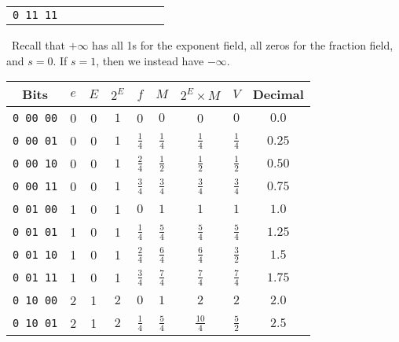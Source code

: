 \documentclass[12pt]{article}
\newenvironment{ex}[2][Exercise]{\begin{trivlist}
		\item[\hskip \labelsep {\bfseries #1}\hskip \labelsep {\bfseries #2.}]}{\end{trivlist}}
\newenvironment{sol}[1][Solution]{\begin{trivlist}
		\item[\hskip \labelsep {\bfseries #1:}]}{\end{trivlist}}
\begin{document}
\begin{ex}{2.47}
\begin{center}
\begin{tabular}{ccccccccc}
			\texttt{0 11 11} & \makebox[1cm]{\hrulefill} & \makebox[1cm]{\hrulefill} & \makebox[1cm]{\hrulefill} & \makebox[1cm]{\hrulefill} & \makebox[1cm]{\hrulefill} & \makebox[1cm]{\hrulefill} & \makebox[1cm]{\hrulefill} & \makebox[1cm]{\hrulefill} \\
		\end{tabular}
	\end{center}
\end{ex}

\begin{sol}
	\
	Recall that $+\infty$ has all 1s for the exponent field, all zeros
	for the fraction field, and $s=0$. If $s=1$, then we instead have
	$-\infty$.
	\begin{center}
		\def\arraystretch{1.25}
		\begin{tabular}{ccccccccc}
			Bits  & $e$ & $E$ & $2^E$ & $f$ & $M$ & $2^E\times M$ &  $V$ & Decimal\\
			\hline
			\texttt{0 00 00} & 0 & 0 & $1$ & 0 & $0$ & 0 & $0$ & $0.0$ \\
			
			\texttt{0 00 01} & 0 & 0 & $1$ & $\frac{1}{4}$ & $\frac{1}{4}$ & 
			$\frac{1}{4}$& $\frac{1}{4}$ & $0.25$ \\
			
			\texttt{0 00 10} & 0 & 0 & $1$ & $\frac{2}{4}$ & $\frac{1}{2}$ & 
			$\frac{1}{2}$ & $\frac{1}{2}$ & $0.50$ \\
			
			\texttt{0 00 11} & 0 & 0 & $1$ & $\frac{3}{4}$ & $\frac{3}{4}$ & 
			$\frac{3}{4}$ & $\frac{3}{4}$ & $0.75$ \\
			
			\texttt{0 01 00} & 1 & 0 & 1 & $0$ & $1$ & $1$ & $1$ & $1.0$ \\
			
			\texttt{0 01 01} & 1 & 0 & 1 & $\frac{1}{4}$ & $\frac{5}{4}$ & $\frac{5}{4}$ & $\frac{5}{4}$ & $1.25$ \\
			
			\texttt{0 01 10} & 1 & 0 & 1 & $\frac{2}{4}$ & $\frac{6}{4}$ & $\frac{6}{4}$ & 
			$\frac{3}{2}$ & $1.5$ \\
			
			\texttt{0 01 11} & 1 & 0 & 1 & $\frac{3}{4}$ & $\frac{7}{4}$ & $\frac{7}{4}$ & $\frac{7}{4}$ & $1.75$ \\
			
			\texttt{0 10 00} & 2 & 1 & $2$ & $0$ & $1$& $2$ & $2$ & $2.0$ \\
			
			\texttt{0 10 01} & 2 & 1 & $2$ & $\frac{1}{4}$ & $\frac{5}{4}$ & $\frac{10}{4}$ & $\frac{5}{2}$ & $2.5$ \\
			

\end{tabular}
\end{center}
\end{sol}
\end{document}
